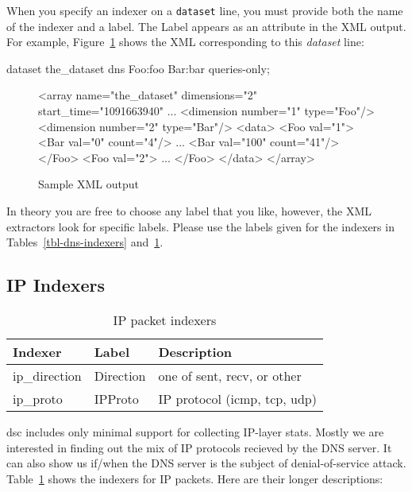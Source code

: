 \documentclass{report}
\def\dsc{{\sc dsc}}
\begin{document}
When you specify an indexer on a {\tt dataset\/} line, you must
provide both the name of the indexer and a label.  The Label appears
as an attribute in the XML output.  For example,
Figure~\ref{fig-sample-xml} shows the XML corresponding to this
{\em dataset\/} line:

\begin{MyVerbatim}
dataset the_dataset dns Foo:foo Bar:bar queries-only;
\end{MyVerbatim}

\begin{figure}
\begin{MyVerbatim}
<array name="the_dataset" dimensions="2" start_time="1091663940" ...
  <dimension number="1" type="Foo"/>
  <dimension number="2" type="Bar"/>
  <data>
    <Foo val="1">
      <Bar val="0" count="4"/>
      ...
      <Bar val="100" count="41"/>
    </Foo>
    <Foo val="2">
      ...
    </Foo>
  </data>
</array>
\end{MyVerbatim}
\caption{\label{fig-sample-xml}Sample XML output}
\end{figure}

In theory you are free to choose any label that you like, however,
the XML extractors look for specific labels.  Please use the labels
given for the indexers in Tables~\ref{tbl-dns-indexers}
and~\ref{tbl-ip-indexers}.

\subsection{IP Indexers}

\begin{table}
\begin{center}
\begin{tabular}{|lll|}
\hline
Indexer & Label & Description \\
\hline 
ip\_direction & Direction & one of sent, recv, or other \\
ip\_proto & IPProto & IP protocol (icmp, tcp, udp) \\
\hline
\end{tabular}
\caption{\label{tbl-ip-indexers}IP packet indexers}
\end{center}
\end{table}

{\dsc} includes only minimal support for collecting IP-layer
stats.  Mostly we are interested in finding out the mix of
IP protocols recieved by the DNS server.  It can also show us
if/when the DNS server is the subject of denial-of-service
attack.
Table~\ref{tbl-ip-indexers} shows the indexers for IP packets.
Here are their longer descriptions:
\end{document}
